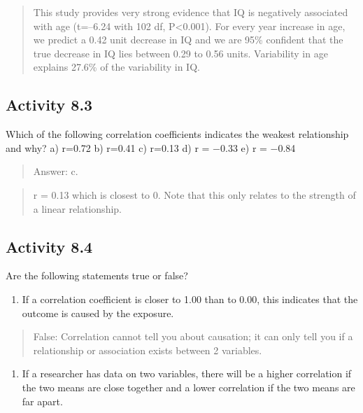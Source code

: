 \documentclass[
]{memoir}
\providecommand{\tightlist}{%
  \setlength{\itemsep}{0pt}\setlength{\parskip}{0pt}}
\begin{document}
\begin{quote}
This study provides very strong evidence that IQ is negatively associated with age (t=--6.24 with 102 df, P\textless0.001). For every year increase in age, we predict a 0.42 unit decrease in IQ and we are 95\% confident that the true decrease in IQ lies between 0.29 to 0.56 units. Variability in age explains 27.6\% of the variability in IQ.
\end{quote}

\hypertarget{activity-8.3}{%
\subsection*{Activity 8.3}\label{activity-8.3}}

Which of the following correlation coefficients indicates the weakest relationship and why?
a) r=0.72
b) r=0.41
c) r=0.13
d) r = −0.33
e) r = −0.84

\begin{quote}
Answer: c.
\end{quote}

\begin{quote}
r = 0.13 which is closest to 0. Note that this only relates to the strength of a linear relationship.
\end{quote}

\hypertarget{activity-8.4}{%
\subsection*{Activity 8.4}\label{activity-8.4}}

Are the following statements true or false?

\begin{enumerate}
\def\labelenumi{\alph{enumi})}
\tightlist
\item
  If a correlation coefficient is closer to 1.00 than to 0.00, this indicates that the outcome is caused by the exposure.
\end{enumerate}

\begin{quote}
False: Correlation cannot tell you about causation; it can only tell you if a relationship or association exists between 2 variables.
\end{quote}

\begin{enumerate}
\def\labelenumi{\alph{enumi})}
\setcounter{enumi}{1}
\tightlist
\item
  If a researcher has data on two variables, there will be a higher correlation if the two means are close together and a lower correlation if the two means are far apart.
\end{enumerate}
\end{document}
